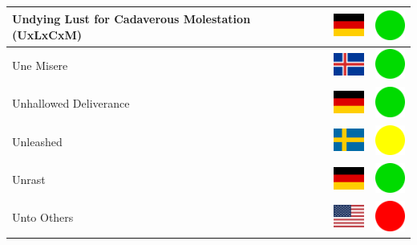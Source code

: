 \documentclass[12pt, a4paper, twoside]{report}
\begin{document}
\begin{center}
\begin{longtable}{|p{5cm}|p{2cm}|p{2cm}|}
 Undying Lust for Cadaverous Molestation (UxLxCxM)          & \includegraphics[width=1cm]{../4x3/de} &   \includegraphics[width=1cm]{../likes/y} \\ \hline
 Une Misere                                                 & \includegraphics[width=1cm]{../4x3/is} &   \includegraphics[width=1cm]{../likes/y} \\ \hline
 Unhallowed Deliverance                                     & \includegraphics[width=1cm]{../4x3/de} &   \includegraphics[width=1cm]{../likes/y} \\ \hline
 Unleashed                                                  & \includegraphics[width=1cm]{../4x3/se} &   \includegraphics[width=1cm]{../likes/m} \\ \hline
 Unrast                                                     & \includegraphics[width=1cm]{../4x3/de} &   \includegraphics[width=1cm]{../likes/y} \\ \hline
 Unto Others                                                & \includegraphics[width=1cm]{../4x3/us} &   \includegraphics[width=1cm]{../likes/n} \\ \hline

\end{longtable}
\end{center}
\end{document}
